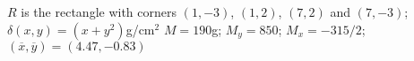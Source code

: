 {$R$ is the rectangle with corners $(1,-3)$, $(1,2)$, $(7,2)$ and $(7,-3)$; $\delta(x,y) = (x+y^2)$g/cm$^2$
}
{$M = 190$g; $M_y= 850$; $M_x = -315/2$; $(\overline{x},\overline{y}) = (4.47,-0.83)$
}